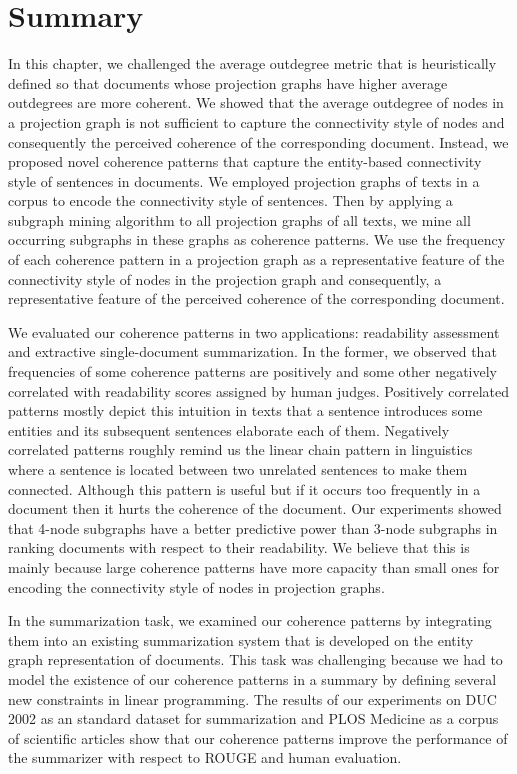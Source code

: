 \section{Summary}
\label{sec:summary}

In this chapter, we challenged the average outdegree metric that is heuristically defined so that documents whose projection graphs have higher average outdegrees are more coherent. 
We showed that the average outdegree of nodes in a projection graph is not sufficient to capture the connectivity style of nodes and consequently the perceived coherence of the corresponding document. 
Instead, we proposed novel coherence patterns that capture the entity-based connectivity style of sentences in documents. 
We employed projection graphs of texts in a corpus to encode the connectivity style of sentences.  
Then by applying a subgraph mining algorithm to all projection graphs of all texts, we mine all occurring subgraphs in these graphs as coherence patterns. 
We use the frequency of each coherence pattern in a projection graph as a representative feature of the connectivity style of nodes in the projection graph and consequently, a representative feature of the perceived coherence of the corresponding document. 

We evaluated our coherence patterns in two applications: readability assessment and extractive \mbox{single-document} summarization. 
In the former, we observed that frequencies of some coherence patterns are positively and some other negatively correlated with readability scores assigned by human judges. 
Positively correlated patterns mostly depict this intuition in texts that a sentence introduces some entities and its subsequent sentences elaborate each of them.  
Negatively correlated patterns roughly remind us the linear chain pattern in linguistics where a sentence is located between two unrelated sentences to make them connected. 
Although this pattern is useful but if it occurs too frequently in a document then it hurts the coherence of the document. 
Our experiments showed that 4-node subgraphs have a better predictive power than  3-node subgraphs in ranking documents with respect to their readability. 
We believe that this is mainly because large coherence patterns have more capacity than small ones for encoding the connectivity style of nodes in projection graphs. 

In the summarization task, we examined our coherence patterns by integrating them into an existing summarization system that is developed on the entity graph representation of documents. 
This task was challenging  because we had to model the existence of our coherence patterns in a summary by defining several new constraints in linear programming.  
The results of our experiments on DUC 2002 as an standard dataset for summarization and PLOS Medicine as a corpus of scientific articles show that our coherence patterns improve the performance of the summarizer with respect to ROUGE and human evaluation. 


